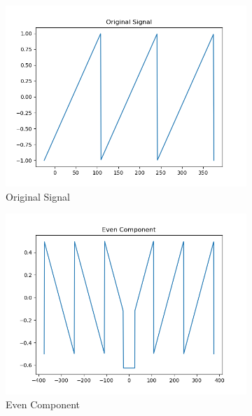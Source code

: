 \documentclass[10pt,a4paper, margin=1in]{article}
\begin{document}
\begin{enumerate}
\begin{enumerate}
\begin{figure}[h]
    \centering
    \begin{subfigure}[t]{0.3\linewidth}
        \centering
        \caption{Original Signal}
        \includegraphics[width=1\linewidth]{assets/q7a/shifted_sawtooth_part_a_original.png}
    \end{subfigure}
    \begin{subfigure}[t]{0.3\linewidth}
        \centering
        \caption{Even Component}
        \includegraphics[width=1\linewidth]{assets/q7a/shifted_sawtooth_part_a_even.png}
    \end{subfigure}
    \begin{subfigure}[t]{0.3\linewidth}
        \centering

\end{subfigure}
\end{figure}
\end{enumerate}
\end{enumerate}
\end{document}
